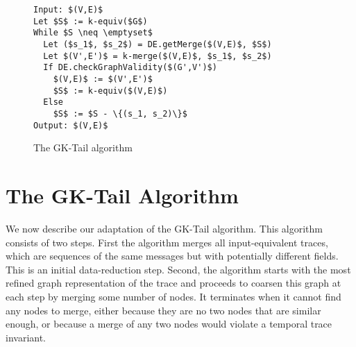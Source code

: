 \begin{figure}[!t]

\begin{lstlisting}[mathescape=true,morekeywords={Input,Output}]
Input: $(V,E)$
Let $S$ := k-equiv($G$)
While $S \neq \emptyset$
  Let ($s_1$, $s_2$) = DE.getMerge($(V,E)$, $S$)
  Let $(V',E')$ = k-merge($(V,E)$, $s_1$, $s_2$)
  If DE.checkGraphValidity($(G',V')$)
    $(V,E)$ := $(V',E')$
    $S$ := k-equiv($(V,E)$)
  Else
    $S$ := $S - \{(s_1, s_2)\}$
Output: $(V,E)$
\end{lstlisting}

\caption{The GK-Tail algorithm}
\label{fig:gk_alg}

\end{figure}

\section{The GK-Tail Algorithm}
\label{sec:gk_tail}

We now describe our adaptation of the GK-Tail algorithm. This
algorithm consists of two steps. First the algorithm merges all
input-equivalent traces, which are sequences of the same messages but
with potentially different fields. This is an initial data-reduction
step. Second, the algorithm starts with the most refined graph
representation of the trace and proceeds to coarsen this graph at each
step by merging some number of nodes. It terminates when it cannot
find any nodes to merge, either because they are no two nodes that are
similar enough, or because a merge of any two nodes would violate a
temporal trace invariant.





